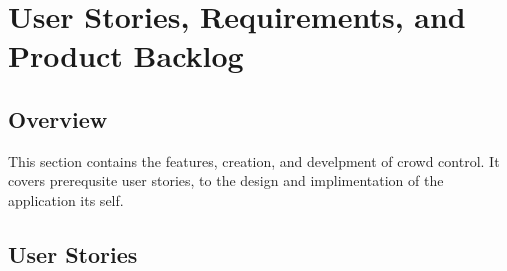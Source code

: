 
\chapter{User Stories,  Requirements, and Product Backlog}
\section{Overview}

This section contains the features, creation, and develpment of crowd control. It covers prerequsite user stories, to the design and implimentation of the application its self.







\section{User Stories}



